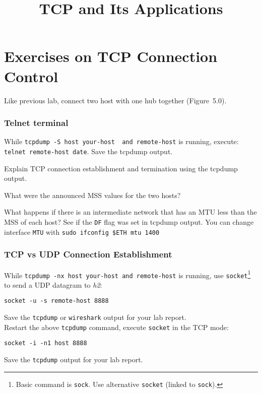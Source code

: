 \documentclass{../UTNetLab}
\title{TCP and Its Applications}
\begin{document}
\part{Exercises on TCP Connection Control}
    Like previous lab, connect two host with one hub together (Figure~5.0).

\section{Telnet terminal}
    While \lstinline[emph={your-host, remote-host}]{tcpdump -S host your-host  and remote-host} is running, execute: \lstinline[emph={your-host, remote-host}]{telnet remote-host date}.
    Save the tcpdump output.
    
    \begin{report}
    \item Explain TCP connection establishment and termination using the tcpdump output.
    
    \item What were the announced MSS values for the two hosts?
    
    \item What happens if there is an intermediate network that has an MTU less than the MSS of each host?
    See if the \texttt{DF} flag was set in tcpdump output.
    You can change interface \texttt{MTU} with \lstinline{sudo ifconfig $ETH mtu 1400}
    \end{report}
    
\section{TCP vs UDP Connection Establishment}
    While \lstinline[emph={your-host, remote-host}]{tcpdump -nx host your-host and remote-host} is running, use \lstinline{socket}\footnote{Basic command is \lstinline{sock}. Use alternative \lstinline{socket} (linked to \lstinline{sock}).} to send a UDP datagram to \textit{h2}:
    \begin{lstlisting}[emph={your-host, remote-host}]
socket -u -s remote-host 8888
    \end{lstlisting}
    {Save} the \lstinline{tcpdump} or \lstinline{wireshark} output for your lab report. \\
    Restart the above \lstinline{tcpdump} command, execute \lstinline{socket} in the TCP mode:
    \begin{lstlisting}[emph={host}]
socket -i -n1 host 8888
    \end{lstlisting}
    {Save} the \lstinline{tcpdump} output for your lab report.
    
\end{document}
